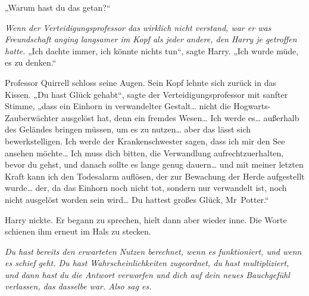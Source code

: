 „Warum hast du das getan?“

\emph{Wenn der Verteidigungsprofessor das wirklich nicht verstand, war er was Freundschaft anging langsamer im Kopf als jeder andere, den Harry je getroffen hatte.}
„Ich dachte immer, ich könnte nichts tun“, sagte Harry. „Ich wurde müde, es zu denken.“

Professor Quirrell schloss seine Augen. Sein Kopf lehnte sich zurück in das Kissen.
„Du hast Glück gehabt“, sagte der Verteidigungsprofessor mit sanfter Stimme,
„dass ein Einhorn in verwandelter Gestalt… nicht die Hogwarts-Zauberwächter ausgelöst hat, denn ein fremdes Wesen… Ich werde es… außerhalb des Geländes bringen müssen, um es zu nutzen… aber das lässt sich bewerkstelligen. Ich werde der Krankenschwester sagen, dass ich mir den See ansehen möchte… Ich muss dich bitten, die Verwandlung aufrechtzuerhalten, bevor du gehst, und danach sollte es lange genug dauern… und mit meiner letzten Kraft kann ich den Todesalarm auflösen, der zur Bewachung der Herde aufgestellt wurde… der, da das Einhorn noch nicht tot, sondern nur verwandelt ist, noch nicht ausgelöst worden sein wird… Du hattest großes Glück, Mr~Potter.“

Harry nickte. Er begann zu sprechen, hielt dann aber wieder inne. Die Worte schienen ihm erneut im Hals zu stecken.

\emph{Du hast bereits den erwarteten Nutzen berechnet, wenn es funktioniert, und wenn es schief geht. Du hast Wahrscheinlichkeiten zugeordnet, du hast multipliziert, und dann hast du die Antwort verworfen und dich auf dein neues Bauchgefühl verlassen, das dasselbe war. Also sag es.}

